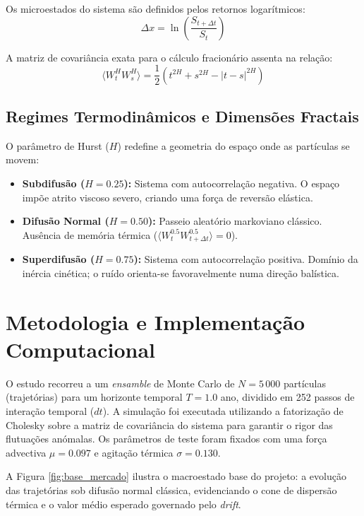 \documentclass[11pt, a4paper]{article}
\begin{document}
Os microestados do sistema são definidos pelos retornos logarítmicos:
\begin{equation}
\Delta x = \ln \left( \frac{S_{t+\Delta t}}{S_t} \right)
\end{equation}

A matriz de covariância exata para o cálculo fracionário assenta na relação:
\begin{equation}
\langle W_t^H W_s^H \rangle = \frac{1}{2} \left( t^{2H} + s^{2H} - |t - s|^{2H} \right)
\end{equation}

\subsection{Regimes Termodinâmicos e Dimensões Fractais}
O parâmetro de Hurst ($H$) redefine a geometria do espaço onde as partículas se movem:
\begin{itemize}
    \item \textbf{Subdifusão ($H = 0.25$):} Sistema com autocorrelação negativa. O espaço impõe atrito viscoso severo, criando uma força de reversão elástica.
    \item \textbf{Difusão Normal ($H = 0.50$):} Passeio aleatório markoviano clássico. Ausência de memória térmica ($\langle W_t^{0.5} W_{t+\Delta t}^{0.5} \rangle = 0$).
    \item \textbf{Superdifusão ($H = 0.75$):} Sistema com autocorrelação positiva. Domínio da inércia cinética; o ruído orienta-se favoravelmente numa direção balística.
\end{itemize}

\section{Metodologia e Implementação Computacional}
O estudo recorreu a um \textit{ensamble} de Monte Carlo de $N = 5\,000$ partículas (trajetórias) para um horizonte temporal $T = 1.0$ ano, dividido em 252 passos de interação temporal ($dt$). A simulação foi executada utilizando a fatorização de Cholesky sobre a matriz de covariância do sistema para garantir o rigor das flutuações anómalas. Os parâmetros de teste foram fixados com uma força advectiva $\mu = 0.097$ e agitação térmica $\sigma = 0.130$.

A Figura \ref{fig:base_mercado} ilustra o macroestado base do projeto: a evolução das trajetórias sob difusão normal clássica, evidenciando o cone de dispersão térmica e o valor médio esperado governado pelo \textit{drift}.
\end{document}
